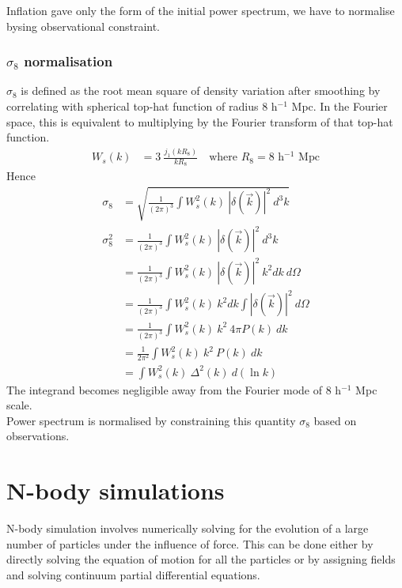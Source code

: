 \documentclass[12pt]{article}
\begin{document}
Inflation gave only the form of the initial power spectrum, we have to normalise bysing observational constraint.
\subsubsection*{$\sigma_8$ normalisation}
$\sigma_8$ is defined as the root mean square of density variation after smoothing by correlating with spherical top-hat function of radius 8 h$^{-1}$ Mpc. In the Fourier space, this is equivalent to multiplying by the Fourier transform of that top-hat function.
\begin{align}
W_s(k) &= 3 ~\frac{j_1(k R_8)}{k R_8} \quad \text{where } R_8 = 8 \text{ h$^{-1}$ Mpc}
\end{align}
Hence
\begin{align}
\sigma_8 &= \sqrt{ \frac{1}{(2 \pi)^3} \int W_s^2(k) ~|\delta (\vec{k})|^2 ~d^3k}\\
\sigma_8^2 &=  \frac{1}{(2 \pi)^3} \int W_s^2(k) ~|\delta (\vec{k})|^2 ~d^3k\\
&= \frac{1}{(2 \pi)^3} \int W_s^2(k) ~|\delta (\vec{k})|^2 ~k^2 dk ~d\Omega\\
&= \frac{1}{(2 \pi)^3} \int W_s^2(k) ~k^2 dk \int |\delta (\vec{k})|^2  ~d\Omega\\
&= \frac{1}{(2 \pi)^3} \int W_s^2(k) ~k^2 ~4\pi P(k) ~dk\\
&= \frac{1}{2 \pi^2} \int W_s^2(k) ~k^2 ~P(k) ~dk\\
&= \int W_s^2(k) ~\Delta^2(k) ~d(\ln k)
\end{align}
%
The integrand becomes negligible away from the Fourier mode of 8 h$^{-1}$ Mpc scale.\\
Power spectrum is normalised by constraining this quantity $\sigma_8$ based on observations.


\section{N-body simulations}

N-body simulation involves numerically solving for the evolution of a large number of particles under the influence of force. This can be done either by directly solving the equation of motion for all the particles or by assigning fields and solving continuum partial differential equations.\\
\end{document}
